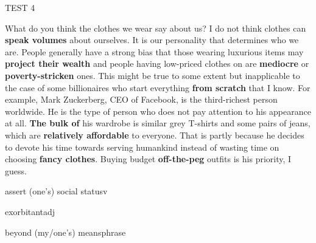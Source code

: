 \begin{glossarymc}[Cambridge 5]
\begin{test}{TEST 4}
    \begin{qa}{What do you think the clothes we wear say about us?}
    I do not think clothes can \textbf{speak volumes} about ourselves. It is our personality that determines who we are. People generally have a strong bias that those wearing luxurious items may \textbf{project their wealth} and people having low-priced clothes on are \textbf{mediocre} or \textbf{poverty-stricken} ones. This might be true to some extent but inapplicable to the case of some billionaires who start everything \textbf{from scratch} that I know. For example, Mark Zuckerberg, CEO of Facebook, is the third-richest person worldwide. He is the type of person who does not pay attention to his appearance at all. \textbf{The bulk of} his wardrobe is similar grey T-shirts and some pairs of jeans, which are \textbf{relatively affordable} to everyone. That is partly because he decides to devote his time towards serving humankind instead of wasting time on choosing \textbf{fancy clothes}. Buying budget \textbf{off-the-peg} outfits is his priority, I guess.
    \end{qa}

        \begin{VocabExplain}[Part 1]
            \begin{ExplainCard}{assert (one's) social status}{v}
            \end{ExplainCard}

            \begin{ExplainCard}{exorbitant}{adj}
            \end{ExplainCard}

            \begin{ExplainCard}{beyond (my/one’s) means}{phrase}
            \end{ExplainCard}


\end{VocabExplain}
\end{test}
\end{glossarymc}

